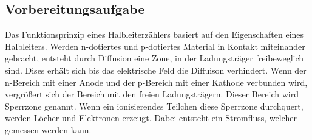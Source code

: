 \subsection{Vorbereitungsaufgabe}
\label{sec:Vorbereitungsaufgabe}

Das Funktionsprinzip eines Halbleiterzählers basiert auf den Eigenschaften eines Halbleiters.
Werden n-dotiertes und p-dotiertes Material in Kontakt miteinander gebracht, entsteht durch Diffusion eine Zone, in 
der Ladungsträger freibeweglich sind. Dises erhält sich bis das elektrische Feld die Diffuison verhindert.
Wenn der n-Bereich mit einer Anode und der p-Bereich mit einer Kathode verbunden wird, vergrößert sich der Bereich
mit den freien Ladungsträgern. Dieser Bereich wird Sperrzone genannt.
Wenn ein ionisierendes Teilchen diese Sperrzone durchquert, werden Löcher und Elektronen erzeugt. Dabei entsteht
ein Stromfluss, welcher gemessen werden kann.
